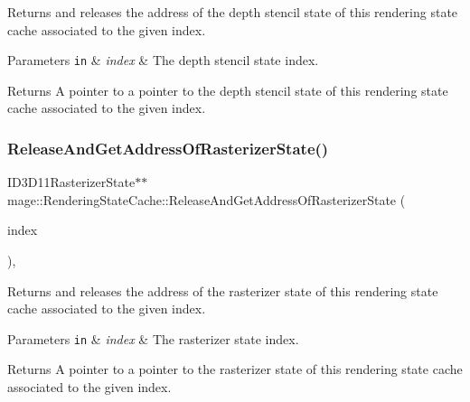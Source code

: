 Returns and releases the address of the depth stencil state of this rendering state cache associated to the given index.


\begin{DoxyParams}[1]{Parameters}
\mbox{\tt in}  & {\em index} & The depth stencil state index. \\
\hline
\end{DoxyParams}
\begin{DoxyReturn}{Returns}
A pointer to a pointer to the depth stencil state of this rendering state cache associated to the given index. 
\end{DoxyReturn}
\hypertarget{structmage_1_1_rendering_state_cache_a564fc7a9c4db6d9e57826a2f631c4cdb}{}\label{structmage_1_1_rendering_state_cache_a564fc7a9c4db6d9e57826a2f631c4cdb} 
\subsubsection{\texorpdfstring{Release\+And\+Get\+Address\+Of\+Rasterizer\+State()}{ReleaseAndGetAddressOfRasterizerState()}}
{\footnotesize\ttfamily I\+D3\+D11\+Rasterizer\+State$\ast$$\ast$ mage\+::\+Rendering\+State\+Cache\+::\+Release\+And\+Get\+Address\+Of\+Rasterizer\+State (\begin{DoxyParamCaption}\item[{\hyperlink{structmage_1_1_rendering_state_cache_ab3cd83fde15cb9f0858e9617e32cd044}{Rasterizer\+State\+Index}}]{index }\end{DoxyParamCaption})\hspace{0.3cm}{\ttfamily [private]}, {\ttfamily [noexcept]}}

Returns and releases the address of the rasterizer state of this rendering state cache associated to the given index.


\begin{DoxyParams}[1]{Parameters}
\mbox{\tt in}  & {\em index} & The rasterizer state index. \\
\hline
\end{DoxyParams}
\begin{DoxyReturn}{Returns}
A pointer to a pointer to the rasterizer state of this rendering state cache associated to the given index. 
\end{DoxyReturn}
\hypertarget{structmage_1_1_rendering_state_cache_a19b035e96b94fca063b559b0a685a256}{}\label{structmage_1_1_rendering_state_cache_a19b035e96b94fca063b559b0a685a256} 
